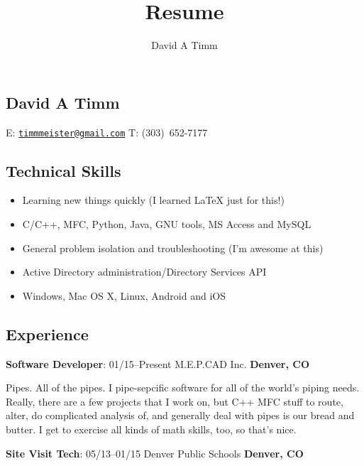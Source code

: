 \documentclass[letterpaper,12pt]{article}
\author{David A Timm}
\title{Resume}
\begin{document}
\begin{center}
\section{David A Timm}

E: \href{mailto:timmmeister@gmail.com?subject=You%27re%20hired!}
{\nolinkurl{timmmeister@gmail.com}}
T: \mbox{(303) 652-7177}
\end{center}

\begin{center}
\subsection{Technical Skills}
\end{center}

\begin{itemize}
\item Learning new things quickly (I learned \LaTeX{} just for this!)
\item C/C++, MFC, Python, Java, GNU tools, MS Access and MySQL
\item General problem isolation and troubleshooting (I'm awesome at this)
\item Active Directory administration/Directory Services API
\item Windows, Mac OS X, Linux, Android and iOS
\end{itemize}

\begin{center}
\subsection{Experience}
\end{center}

\begin{flushleft}
\textbf{Software Developer}: 01/15--Present M.E.P.CAD Inc.
\textbf{Denver, CO}
\end{flushleft}

Pipes. All of the pipes. I pipe-sepcific software for all of the world's piping
needs. Really, there are a few projects that I work on, but C++ MFC stuff to
route, alter, do complicated analysis of, and generally deal with pipes is our
bread and butter. I get to exercise all kinds of math skills, too, so that's 
nice.

\begin{flushleft}
\textbf{Site Visit Tech}: 05/13--01/15 Denver Public Schools
\textbf{Denver, CO}
\end{flushleft}
\end{document}
